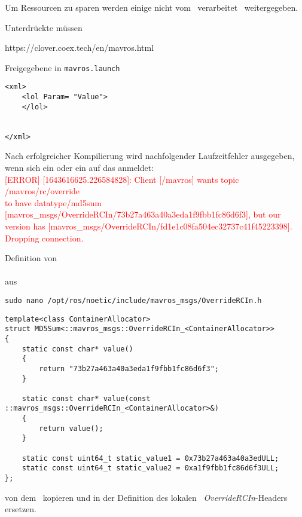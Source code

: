 




Um Ressourcen zu sparen werden einige \Topic[s] nicht vom \Pie\ verarbeitet \bzw\ weitergegeben.

Unterdrückte \Topic[s] müssen 
\missing[ungetested!]

https://clover.coex.tech/en/mavros.html

Freigegebene \Topic[s] in \texttt{mavros.launch}

\begin{lstlisting}[style=Style_XML, numbers=none, caption={[Freigegebene Topics] Freigegebene \Topic[s] in \texttt{mavros.launch}}]
<xml>
	<lol Param= "Value">
	</lol>
	
	
</xml>
\end{lstlisting}


Nach erfolgreicher Kompilierung wird nachfolgender Laufzeitfehler ausgegeben, wenn sich ein  oder ein  auf das  anmeldet:\\
\textcolor{red}{[ERROR] [1643616625.226584828]: Client [/mavros] wants topic /mavros/rc/override \\to have datatype/md5sum [mavros\_msgs/OverrideRCIn/73b27a463a40a3eda1f9fbb1fc86d6f3], but our version has [mavros\_msgs/OverrideRCIn/fd1e1c08fa504ec32737c41f45223398]. Dropping connection.}

Definition von \\ \\aus 

\begin{lstlisting}[style=Style_Bash, caption=Befehl zum Öffnen des \textit{OverrideRCIn}-Headers]
sudo nano /opt/ros/noetic/include/mavros_msgs/OverrideRCIn.h
\end{lstlisting}

\begin{lstlisting}[style=Style_CPP, numbers=none, caption=Definition des Struct \CodeStruct{MD5Sum} für das Template \textit{OverrideRCIn}]
template<class ContainerAllocator>
struct MD5Sum<::mavros_msgs::OverrideRCIn_<ContainerAllocator>>
{
	static const char* value()
	{
		return "73b27a463a40a3eda1f9fbb1fc86d6f3";
	}

	static const char* value(const ::mavros_msgs::OverrideRCIn_<ContainerAllocator>&)
	{
		return value();
	}
	
	static const uint64_t static_value1 = 0x73b27a463a40a3edULL;
	static const uint64_t static_value2 = 0xa1f9fbb1fc86d6f3ULL;
};
\end{lstlisting}

von dem \Pie\ kopieren und in der Definition des lokalen \ROS\ \textit{\mbox{OverrideRCIn}}-Headers ersetzen.








